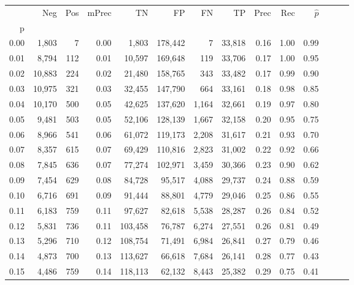 \begin{tabular}{rrrrrrrrrrrrrr}
\toprule
{} &     Neg &  Pos & mPrec &       TN &       FP &      FN &      TP &  Prec &   Rec & $\hat{p}$ \\
p    &         &      &       &          &          &         &         &       &       &           \\
\midrule
0.00 &   1,803 &    7 &  0.00 &    1,803 &  178,442 &       7 &  33,818 &  0.16 &  1.00 &      0.99 \\
0.01 &   8,794 &  112 &  0.01 &   10,597 &  169,648 &     119 &  33,706 &  0.17 &  1.00 &      0.95 \\
0.02 &  10,883 &  224 &  0.02 &   21,480 &  158,765 &     343 &  33,482 &  0.17 &  0.99 &      0.90 \\
0.03 &  10,975 &  321 &  0.03 &   32,455 &  147,790 &     664 &  33,161 &  0.18 &  0.98 &      0.85 \\
0.04 &  10,170 &  500 &  0.05 &   42,625 &  137,620 &   1,164 &  32,661 &  0.19 &  0.97 &      0.80 \\
0.05 &   9,481 &  503 &  0.05 &   52,106 &  128,139 &   1,667 &  32,158 &  0.20 &  0.95 &      0.75 \\
0.06 &   8,966 &  541 &  0.06 &   61,072 &  119,173 &   2,208 &  31,617 &  0.21 &  0.93 &      0.70 \\
0.07 &   8,357 &  615 &  0.07 &   69,429 &  110,816 &   2,823 &  31,002 &  0.22 &  0.92 &      0.66 \\
0.08 &   7,845 &  636 &  0.07 &   77,274 &  102,971 &   3,459 &  30,366 &  0.23 &  0.90 &      0.62 \\
0.09 &   7,454 &  629 &  0.08 &   84,728 &   95,517 &   4,088 &  29,737 &  0.24 &  0.88 &      0.59 \\
0.10 &   6,716 &  691 &  0.09 &   91,444 &   88,801 &   4,779 &  29,046 &  0.25 &  0.86 &      0.55 \\
0.11 &   6,183 &  759 &  0.11 &   97,627 &   82,618 &   5,538 &  28,287 &  0.26 &  0.84 &      0.52 \\
0.12 &   5,831 &  736 &  0.11 &  103,458 &   76,787 &   6,274 &  27,551 &  0.26 &  0.81 &      0.49 \\
0.13 &   5,296 &  710 &  0.12 &  108,754 &   71,491 &   6,984 &  26,841 &  0.27 &  0.79 &      0.46 \\
0.14 &   4,873 &  700 &  0.13 &  113,627 &   66,618 &   7,684 &  26,141 &  0.28 &  0.77 &      0.43 \\
0.15 &   4,486 &  759 &  0.14 &  118,113 &   62,132 &   8,443 &  25,382 &  0.29 &  0.75 &      0.41 \\

\end{tabular}
